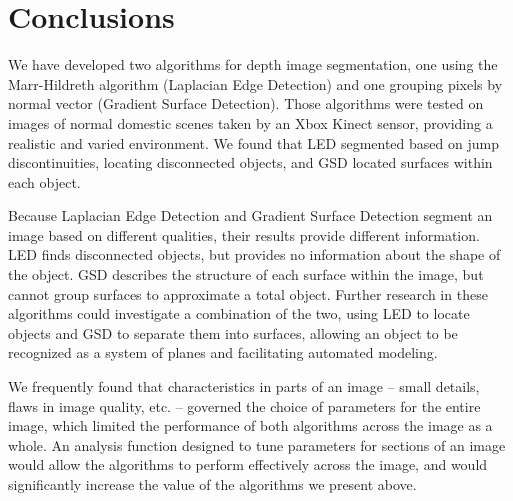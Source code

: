 
\section{Conclusions}
\label{sec:concl}

We have developed two algorithms for depth image segmentation, one using the Marr-Hildreth algorithm (Laplacian Edge Detection) and one grouping pixels by normal vector (Gradient Surface Detection).  Those algorithms were tested on images of normal domestic scenes taken by an Xbox Kinect sensor, providing a realistic and varied environment.  We found that LED segmented based on jump discontinuities, locating disconnected objects, and GSD located surfaces within each object.

Because Laplacian Edge Detection and Gradient Surface Detection segment an image based on different qualities, their results provide different information.  LED finds disconnected objects, but provides no information about the shape of the object.  GSD describes the structure of each surface within the image, but cannot group surfaces to approximate a total object.  Further research in these algorithms could investigate a combination of the two, using LED to locate objects and GSD to separate them into surfaces, allowing an object to be recognized as a system of planes and facilitating automated modeling.  

We frequently found that characteristics in parts of an image -- small details, flaws in image quality, etc. -- governed the choice of parameters for the entire image, which limited the performance of both algorithms across the image as a whole.  An analysis function designed to tune parameters for sections of an image would allow the algorithms to perform effectively across the image, and would significantly increase the value of the algorithms we present above.